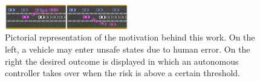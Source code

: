 \documentclass[letterpaper, 10 pt, conference]{ieeeconf}  %
\newcommand\NB[1]{$\spadesuit$\footnote{NB: #1}}
\begin{document}
\begin{figure}[h]
    \includegraphics[width=0.48\textwidth]{fig/highway.png}
    \caption{Pictorial representation of the motivation behind this work. On the left, a vehicle may enter unsafe states due to human error. On the right the desired outcome is displayed in which an autonomous controller takes over when the risk is above a certain threshold.}
    \label{fig:hiway}
\end{figure}
    
\end{document}
